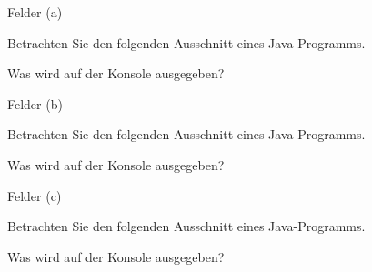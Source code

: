 \begin{frame}[t]%
  \setcounter{exercise}{22} %
  \medskip
  \begin{exercise}{Felder (a)}
  \begin{body}
  Betrachten Sie den folgenden Ausschnitt eines Java-Programms.
  
  \begin{parts}
  \item Was wird auf der Konsole ausgegeben?
  \pause
  \item \code{[1, 3, 6, 10, 15]}
  \end{parts}
  \end{body}
  \end{exercise}
\end{frame}


\begin{frame}[t]%
  \setcounter{exercise}{22} %
  \medskip
  \begin{exercise}{Felder (b)}
  \begin{body}
  Betrachten Sie den folgenden Ausschnitt eines Java-Programms.
  
  \begin{parts}
  \item Was wird auf der Konsole ausgegeben?
  \pause
  \item \code{[1, 3, 5, 7, 9]}
  \end{parts}
  \end{body}
  \end{exercise}
\end{frame}

\begin{frame}[t]%
  \setcounter{exercise}{22} %
  \medskip
  \begin{exercise}{Felder (c)}
  \begin{body}
  Betrachten Sie den folgenden Ausschnitt eines Java-Programms.
  
  \begin{parts}
  \item Was wird auf der Konsole ausgegeben?
  \pause
  \item \code{[1, 2, 3, 2, 1]}
  \end{parts}
  \end{body}
  \end{exercise}
\end{frame}


